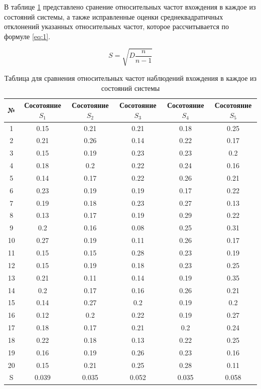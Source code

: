 В таблице \ref{table:Table_for_cheking_chislo_vlhozdeniy} представлено сранение относительных частот вхождения в каждое из состояний системы,
а также исправленные оценки среднеквадратичных отклонений указанных относительных частот, которое рассчитывается по формуле \ref{eq:1}.

\[
S = \sqrt{D \frac{n}{n-1}}
\tag{1} \label{eq:1}
\]

\begin{center}
\begin{table}[H]
\centering
\begin{tabular}{| c | c | c | c | c | c |}
\hline
№ & Сосотояние $S_1$ & Сосотояние $S_2$ & Сосотояние $S_3$ & Сосотояние $S_4$ & Сосотояние $S_5$ \\ \hline
  1 & 0.15 & 0.21 & 0.21 & 0.18 & 0.25 \\
 \hline 2 & 0.21 & 0.26 & 0.14 & 0.22 & 0.17 \\
 \hline 3 & 0.15 & 0.19 & 0.23 & 0.23 & 0.2 \\
 \hline 4 & 0.18 & 0.2 & 0.22 & 0.24 & 0.16 \\
 \hline 5 & 0.14 & 0.17 & 0.22 & 0.26 & 0.21 \\
 \hline 6 & 0.23 & 0.19 & 0.19 & 0.17 & 0.22 \\
 \hline 7 & 0.19 & 0.18 & 0.23 & 0.27 & 0.13 \\
 \hline 8 & 0.13 & 0.17 & 0.19 & 0.29 & 0.22 \\
 \hline 9 & 0.2 & 0.16 & 0.08 & 0.25 & 0.31 \\
 \hline 10 & 0.27 & 0.19 & 0.11 & 0.26 & 0.17 \\
 \hline 11 & 0.15 & 0.15 & 0.28 & 0.23 & 0.19 \\
 \hline 12 & 0.15 & 0.19 & 0.18 & 0.23 & 0.25 \\
 \hline 13 & 0.21 & 0.11 & 0.14 & 0.19 & 0.35 \\
 \hline 14 & 0.2 & 0.17 & 0.16 & 0.26 & 0.21 \\
 \hline 15 & 0.14 & 0.27 & 0.2 & 0.19 & 0.2 \\
 \hline 16 & 0.12 & 0.2 & 0.22 & 0.19 & 0.27 \\
 \hline 17 & 0.18 & 0.17 & 0.21 & 0.2 & 0.24 \\
 \hline 18 & 0.22 & 0.18 & 0.13 & 0.22 & 0.25 \\
 \hline 19 & 0.16 & 0.19 & 0.26 & 0.23 & 0.16 \\
 \hline 20 & 0.15 & 0.21 & 0.25 & 0.28 & 0.11 \\
 \hline \hline
S & 0.039 & 0.035 & 0.052 & 0.035 & 0.058 \\ \hline
\end{tabular}
\caption{Таблица для сравнения относительных частот наблюдений вхождения в каждое из состояний системы}
\label{table:Table_for_cheking_chislo_vlhozdeniy}
\end{table}
\end{center}


